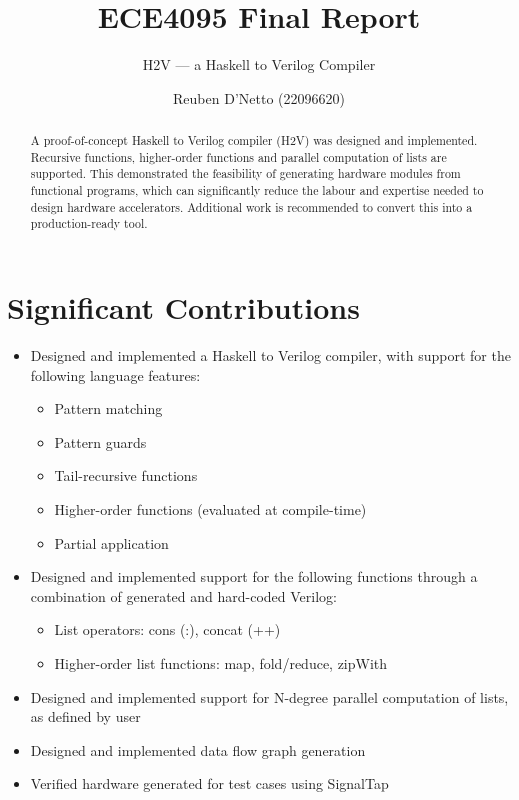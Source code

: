 \documentclass[english,onecolumn]{scrartcl}
\begin{document}
\title{ECE4095 Final Report}
\subtitle{H2V --- a Haskell to Verilog Compiler}
\author{Reuben D'Netto (22096620)}
\maketitle

\begin{abstract}
A proof-of-concept Haskell to Verilog compiler (H2V) was designed and implemented.
Recursive functions, higher-order functions and parallel computation of lists are supported.
This demonstrated the feasibility of generating hardware modules from functional programs, which can significantly reduce
the labour and expertise needed to design hardware accelerators.
Additional work is recommended to convert this into a production-ready tool.
\end{abstract}

\pagebreak{}
\tableofcontents{}
\pagebreak{}


\section{Significant Contributions}
\begin{itemize}
    \item Designed and implemented a Haskell to Verilog compiler, with support for the following language features:
        \begin{itemize}
            \item Pattern matching
            \item Pattern guards
            \item Tail-recursive functions
            \item Higher-order functions (evaluated at compile-time)
            \item Partial application
        \end{itemize}
    \item Designed and implemented support for the following functions through a combination of generated and hard-coded Verilog:
        \begin{itemize}
            \item List operators: cons (:), concat (++)
            \item Higher-order list functions: map, fold/reduce, zipWith
        \end{itemize}
    \item Designed and implemented support for N-degree parallel computation of lists, as defined by user
    \item Designed and implemented data flow graph generation
    \item Verified hardware generated for test cases using SignalTap
\end{itemize}
\end{document}

